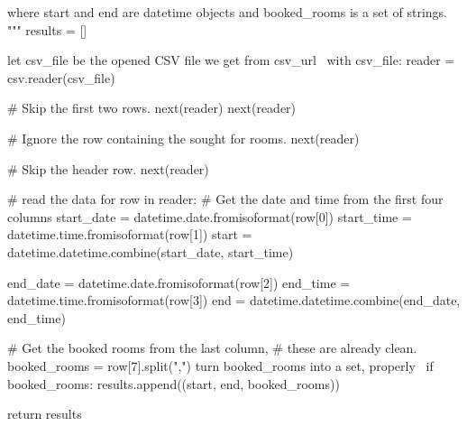   where start and end are datetime objects and booked_rooms is a set of 
  strings.
  """
  results = []

  \LA{}let \code{}csv{\_}file\edoc{} be the opened CSV file we get from \code{}csv{\_}url\edoc{}~{\nwtagstyle{}}\RA{}
  with csv_file:
    reader = csv.reader(csv_file)

    # Skip the first two rows.
    next(reader)
    next(reader)

    # Ignore the row containing the sought for rooms.
    next(reader)

    # Skip the header row.
    next(reader)

    # read the data
    for row in reader:
      # Get the date and time from the first four columns
      start_date = datetime.date.fromisoformat(row[0])
      start_time = datetime.time.fromisoformat(row[1])
      start = datetime.datetime.combine(start_date, start_time)

      end_date = datetime.date.fromisoformat(row[2])
      end_time = datetime.time.fromisoformat(row[3])
      end = datetime.datetime.combine(end_date, end_time)

      # Get the booked rooms from the last column,
      # these are already clean.
      booked_rooms = row[7].split(",")
      \LA{}turn \code{}booked{\_}rooms\edoc{} into a set, properly~{\nwtagstyle{}}\RA{}
      if booked_rooms:
        results.append((start, end, booked_rooms))

  return results
\nwendcode{}
